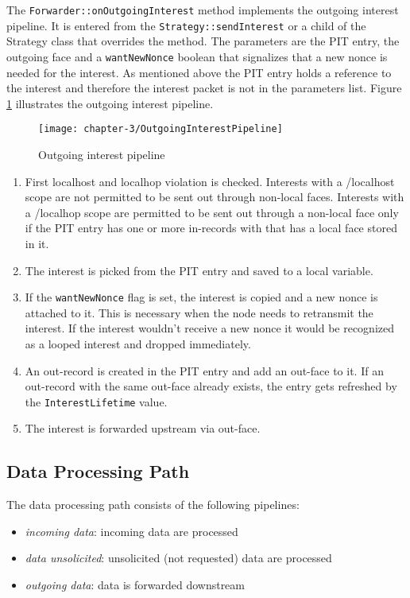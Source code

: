 The \texttt{Forwarder::onOutgoingInterest} method implements the outgoing interest pipeline. It is entered from the \texttt{Strategy::sendInterest} or a child of the Strategy class that overrides the method. The parameters are the PIT entry, the outgoing face and a \texttt{wantNewNonce} boolean that signalizes that a new nonce is needed for the interest. As mentioned above the PIT entry holds a reference to the interest and therefore the interest packet is not in the parameters list. Figure \ref{fig:OutgoingInterestPipeline} illustrates the outgoing interest pipeline.

\begin{figure}[H]
  \centering
  \texttt{[image: chapter-3/OutgoingInterestPipeline]}
  \caption{Outgoing interest pipeline}
  \label{fig:OutgoingInterestPipeline}
\end{figure}

\begin{enumerate}
\item First localhost and localhop violation is checked. Interests with a /localhost scope are not permitted to be sent out through non-local faces. Interests with a /localhop scope are permitted to be sent out through a non-local face only if the PIT entry has one or more in-records with that has a local face stored in it.
\item The interest is picked from the PIT entry and saved to a local variable.
\item If the \texttt{wantNewNonce} flag is set, the interest is copied and a new nonce is attached to it. This is necessary when the node needs to retransmit the interest. If the interest wouldn't receive a new nonce it would be recognized as a looped interest and dropped immediately.
\item An out-record is created in the PIT entry and add an out-face to it. If an out-record with the same out-face already exists, the entry gets refreshed by the \texttt{InterestLifetime} value.
\item The interest is forwarded upstream via out-face.
\end{enumerate}

\subsection{Data Processing Path}

The data processing path consists of the following pipelines:

\begin{itemize}
\item \emph{incoming data}: incoming data are processed
\item \emph{data unsolicited}: unsolicited (not requested) data are processed
\item \emph{outgoing data}: data is forwarded downstream
\end{itemize}

